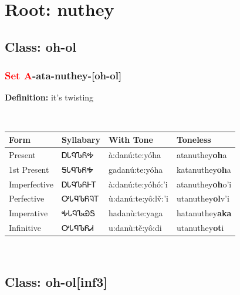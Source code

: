 \needspace{4in}
\section*{Root: nuthey}
\nopagebreak
{}
\needspace{3in}
\subsection*{Class: oh-ol}
\nopagebreak
\needspace{2in}
\subsubsection*{\textcolor{Red}{Set A}{-}ata{-}\textbf{nuthey}{-}[oh-ol]}
\nopagebreak
\textbf{Definition: } it{\textquoteright}s twisting
\\[0.5em]
\begin{tabularx}{\textwidth}{l X X X}%
\toprule%
\textbf{Form}&\textbf{Syllabary}&\textbf{With Tone}&\textbf{Toneless}\\%
\midrule%
Present&ᎠᏓᏄᏖᏲᎭ&à:danú:te:yóha&atanuthey\textbf{oh}a\\%
1st Present&ᎦᏓᏄᏖᏲᎭ&gadanú:te:yóha&katanuthey\textbf{oh}a\\%
Imperfective&ᎠᏓᏄᏖᏲᎰᎢ&à:danú:te:yóhó:’i&atanuthey\textbf{oh}o'i\\%
Perfective&ᎤᏓᏄᏖᏲᎸᎢ&ù:danú:te:yô:lv̌:’i&utanuthey\textbf{ol}v'i\\%
Imperative&ᎭᏓᏄᏖᏯᎦ&hadanù:te:yaga&hatanuthey\textbf{aka}\\%
Infinitive&ᎤᏓᏄᏖᏲᏗ&u:danù:tě:yô:di&utanuthey\textbf{ot}i\\%
\bottomrule%
\end{tabularx}
\\[1em]
\needspace{3in}
\subsection*{Class: oh-ol[inf3]}
\nopagebreak
\needspace{2in}
